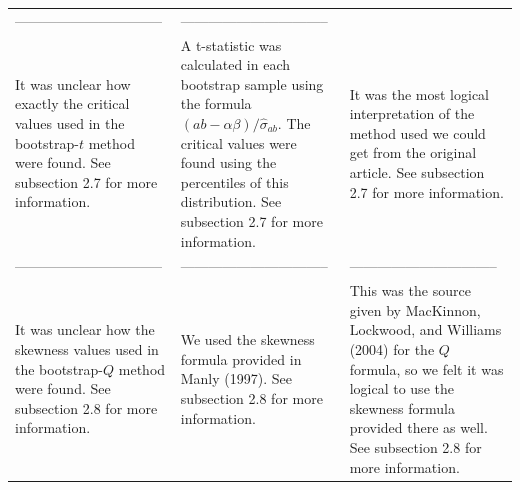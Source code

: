 \documentclass[10,a4paperpaper,]{article}
\begin{document}
\begin{longtable}[]{@{}lll@{}}
\begin{minipage}[t]{0.30\columnwidth}
--------------------------------\strut
\end{minipage} & \begin{minipage}[t]{0.30\columnwidth}\raggedright\strut
--------------------------------\strut
\end{minipage}\tabularnewline
\begin{minipage}[t]{0.30\columnwidth}\raggedright\strut
It was unclear how exactly the critical values used in the
bootstrap-\(t\) method were found. See subsection 2.7 for more
information.\strut
\end{minipage} & \begin{minipage}[t]{0.30\columnwidth}\raggedright\strut
A t-statistic was calculated in each bootstrap sample using the formula
\((ab - \alpha \beta)/\hat{\sigma}_{ab}\). The critical values were
found using the percentiles of this distribution. See subsection 2.7 for
more information.\strut
\end{minipage} & \begin{minipage}[t]{0.30\columnwidth}\raggedright\strut
It was the most logical interpretation of the method used we could get
from the original article. See subsection 2.7 for more
information.\strut
\end{minipage}\tabularnewline
\begin{minipage}[t]{0.30\columnwidth}\raggedright\strut
--------------------------------\strut
\end{minipage} & \begin{minipage}[t]{0.30\columnwidth}\raggedright\strut
--------------------------------\strut
\end{minipage} & \begin{minipage}[t]{0.30\columnwidth}\raggedright\strut
--------------------------------\strut
\end{minipage}\tabularnewline
\begin{minipage}[t]{0.30\columnwidth}\raggedright\strut
It was unclear how the skewness values used in the bootstrap-\(Q\)
method were found. See subsection 2.8 for more information.\strut
\end{minipage} & \begin{minipage}[t]{0.30\columnwidth}\raggedright\strut
We used the skewness formula provided in Manly (1997). See subsection
2.8 for more information.\strut
\end{minipage} & \begin{minipage}[t]{0.30\columnwidth}\raggedright\strut
This was the source given by MacKinnon, Lockwood, and Williams (2004)
for the \(Q\) formula, so we felt it was logical to use the skewness
formula provided there as well. See subsection 2.8 for more
information.\strut
\end{minipage}\tabularnewline
\bottomrule
\end{longtable}
\end{document}
